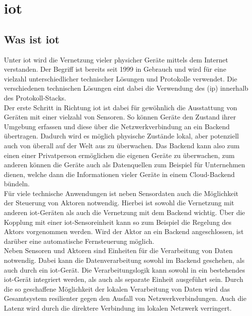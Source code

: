 \chapter{\acrfull{iot}}\label{ch:3}
\section{Was ist \acrshort{iot}}\label{sec:3.1}
Unter \acrshort{iot} wird die Vernetzung vieler physicher Geräte mittels dem Internet verstanden. Der Begriff ist bereits seit 1999 in Gebrauch\cite*[]{IARJSET} und wird für eine vielzahl unterschiedlicher technischer Lösungen und Protokolle verwendet. Die verschiedenen technischen Lösungen eint dabei die Verwendung des  (\acrshort{ip}) innerhalb des \Gls{Protokoll-Stack}s\cite*[]{Rayes2019}.\\ Der erste Schritt in Richtung \acrshort{iot} ist dabei für gewöhnlich die Ausstattung von Geräten mit einer vielzahl von Sensoren. So können Geräte den Zustand ihrer Umgebung erfassen und diese über die Netzwerkverbindung an ein \Gls{Backend} übertragen. Dadurch wird es möglich physische Zustände lokal, aber potenziell auch von überall auf der Welt aus zu überwachen. Das Backend kann also zum einen einer Privatperson ermöglichen die eigenen Geräte zu überwachen, zum anderen können die Geräte auch als Datenquellen zum Beispiel für Unternehmen dienen, welche dann die Informationen vieler Geräte in einem \Gls{Cloud}-\Gls{Backend} bündeln\cite*[]{inproceedings}.\\ Für viele technische Anwendungen ist neben Sensordaten auch die Möglichkeit der Steuerung von Aktoren notwendig. Hierbei ist sowohl die Vernetzung mit anderen \acrshort{iot}-Geräten als auch die Vernetzung mit dem \Gls{Backend} wichtig. Über die Kopplung mit einer \acrshort{iot}-Sensoreinheit kann so zum Beispiel die Regelung des Aktors vorgenommen werden. Wird der Aktor an ein Backend angeschlossen, ist darüber eine automatische Fernsteuerung möglich\cite*[]{Rayes2022}.\\ Neben Sensoren und Aktoren sind Einheiten für die Verarbeitung von Daten notwendig. Dabei kann die Datenverarbeitung sowohl im \Gls{Backend} geschehen, als auch durch ein \acrshort{iot}-Gerät. Die Verarbeitungslogik kann sowohl in ein bestehendes \acrshort{iot}-Gerät integriert werden, als auch als separate Einheit ausgeführt sein. Durch die so geschaffene Möglichkeit der lokalen Verarbeitung von Daten wird das Gesamtsystem resilienter gegen den Ausfall von Netzwerkverbindungen. Auch die Latenz wird durch die direktere Verbindung im lokalen Netzwerk verringert\cite*[]{Rayes2022}.
